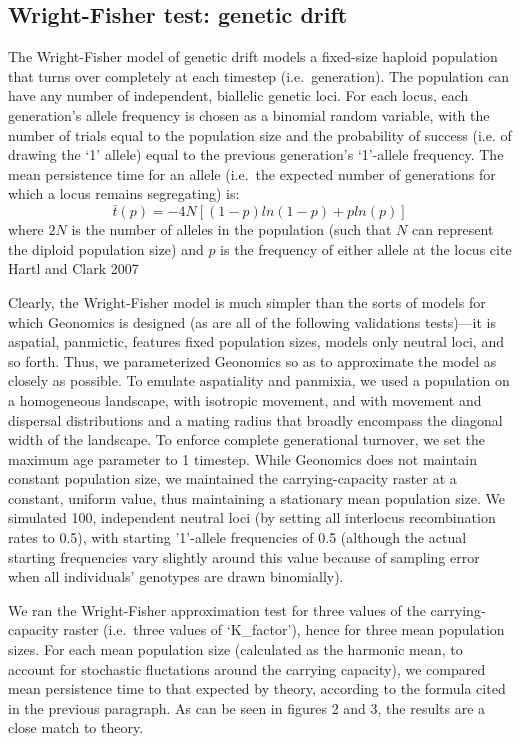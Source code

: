 ﻿\documentclass{article}
\begin{document}
\subsection{Wright-Fisher test: genetic drift}
The Wright-Fisher model of genetic drift models a fixed-size haploid population that
turns over completely at each timestep (i.e.\ generation).
The population can have any number of independent, biallelic genetic loci.
For each locus, each generation’s allele
frequency is chosen as a binomial random variable, with the number of trials equal to
the population size and the probability of success (i.e. of drawing the ‘1’ allele)
equal to the previous generation’s ‘1’-allele frequency.
The mean persistence time for an allele 
(i.e.\ the expected number of generations for which a locus remains segregating) 
is:
\begin{equation}
\bar{t}(p) = -4N[(1 - p)ln(1 - p) + pln(p)]
\end{equation}
where $2N$ is the number of alleles in the population (such that $N$ can
represent the diploid population size) and $p$ is the frequency of either allele
at the locus {\large cite Hartl and Clark 2007}

Clearly, the Wright-Fisher model is much simpler than the sorts of models for which
Geonomics is designed (as are all of the following validations tests)---it is aspatial,
panmictic, features fixed population sizes, models only neutral loci, and so forth. 
Thus, we parameterized Geonomics so as to approximate the model as closely as possible.
To emulate aspatiality and panmixia, we used a population on a homogeneous landscape,
with isotropic movement, and with movement and dispersal distributions
and a mating radius that broadly encompass the diagonal width of the landscape.
To enforce complete generational turnover, we set the
maximum age parameter to 1 timestep. While Geonomics does not maintain constant population
size, we maintained the carrying-capacity raster at a constant, uniform value, thus
maintaining a stationary mean population size. We simulated 100, independent neutral
loci (by setting all interlocus recombination rates to 0.5), with starting '1'-allele
frequencies of 0.5 (although the actual starting frequencies vary slightly around
this value because of sampling error when all individuals' genotypes are drawn binomially).

We ran the Wright-Fisher approximation test for three values of the
carrying-capacity raster (i.e.\ three values of `K\_factor'), hence for three mean
population sizes. For each mean population size (calculated as the harmonic mean,
to account for stochastic fluctations around the carrying capacity), we compared
mean persistence time to that
expected by theory, according to the formula cited in the previous paragraph. As can be
seen in figures 2 and 3, the results are a close match to theory.
\end{document}
